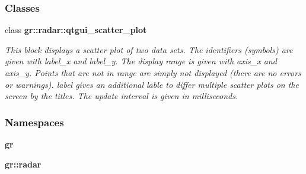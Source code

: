 \subsubsection*{Classes}
\begin{DoxyCompactItemize}
\item 
class {\bf gr\+::radar\+::qtgui\+\_\+scatter\+\_\+plot}
\begin{DoxyCompactList}\small\item\em This block displays a scatter plot of two data sets. The identifiers (symbols) are given with label\+\_\+x and label\+\_\+y. The display range is given with axis\+\_\+x and axis\+\_\+y. Points that are not in range are simply not displayed (there are no errors or warnings). label gives an additional lable to differ multiple scatter plots on the screen by the titles. The update interval is given in milliseconds. \end{DoxyCompactList}\end{DoxyCompactItemize}
\subsubsection*{Namespaces}
\begin{DoxyCompactItemize}
\item 
 {\bf gr}
\item 
 {\bf gr\+::radar}
\end{DoxyCompactItemize}
